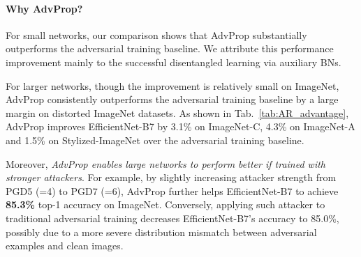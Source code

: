 \documentclass[10pt,twocolumn,letterpaper]{article}
\begin{document}
\paragraph{Why AdvProp?}
For small networks, our comparison shows that AdvProp substantially outperforms the adversarial training baseline. We attribute this performance improvement mainly to the successful disentangled learning via auxiliary BNs.

For larger networks, though the improvement is relatively small on ImageNet, AdvProp consistently outperforms the adversarial training baseline by a large margin on distorted ImageNet datasets. As shown in Tab.~\ref{tab:AR_advantage},  AdvProp improves EfficientNet-B7 by 3.1\% on ImageNet-C, 4.3\% on ImageNet-A and 1.5\% on Stylized-ImageNet over the adversarial training baseline. 


\begin{table}[h!]
\vspace{-0.9em}
\caption{AdvProp demonstrates much stronger generalization ability on distorted ImageNet datasets (\eg, ImageNet-C) than the adversarial training baseline for larger models.}
\label{tab:AR_advantage}
\vspace{-0.7em}
\end{table}



Moreover, \emph{AdvProp enables large networks to perform better if trained with stronger attackers}. For example, by slightly increasing attacker strength from PGD5 (=4) to PGD7 (=6), AdvProp further helps EfficientNet-B7 to achieve \textbf{85.3\%} top-1 accuracy on ImageNet. Conversely, applying such attacker to traditional adversarial training decreases EfficientNet-B7's accuracy to 85.0\%, possibly due to a more severe distribution mismatch between adversarial examples and clean images.
\end{document}
